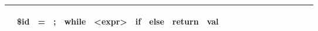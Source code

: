 \documentclass[11pt,a4paper]{article}
\begin{document}
\begin{table}[h!]
\begin{tabular}{|l|l|l|l|l|l|l|l|l|l|l|l|l|l|l|l|l|l|l|l|l|}
                                                                                                                                                        & \begin{sideways}\$id\end{sideways}
                                                                                                                                                                & \begin{sideways}=\end{sideways}
                                                                                                                                                                    & \begin{sideways}; \end{sideways}
                                                                                                                                                                        & \begin{sideways}while \end{sideways}
                                                                                                                                                                                & \begin{sideways}\textless{}expr\textgreater{}\end{sideways}
                                                                                                                                                                                                                & \begin{sideways}if\end{sideways}
                                                                                                                                                                                                                        & \begin{sideways}else\end{sideways}
                                                                                                                                                                                                                                 & \begin{sideways}return\end{sideways}
                                                                                                                                                                                                                                            & \begin{sideways}val\end{sideways} \\ \hline

\end{tabular}
\end{table}
\end{document}
